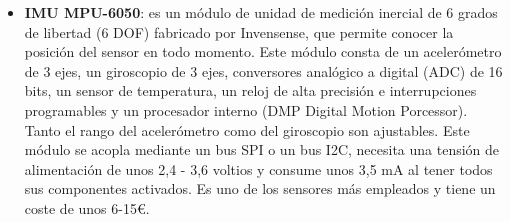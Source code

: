 \begin{itemize}
    \item \textbf{IMU MPU-6050}: es un módulo de unidad de medición inercial de 6 grados de libertad (6 DOF) fabricado por Invensense, que permite conocer la posición del sensor en todo momento. Este módulo consta de un acelerómetro de 3 ejes, un giroscopio de 3 ejes, conversores analógico a digital (ADC) de 16 bits, un sensor de temperatura, un reloj de alta precisión e interrupciones programables y un procesador interno (DMP Digital Motion Porcessor). Tanto el rango del acelerómetro como del giroscopio son ajustables. Este módulo se acopla mediante un bus SPI o un bus I2C, necesita una tensión de alimentación de unos 2,4 - 3,6 voltios y consume unos 3,5 mA al tener todos sus componentes activados. Es uno de los sensores más empleados y tiene un coste de unos 6-15€.
\end{itemize}
